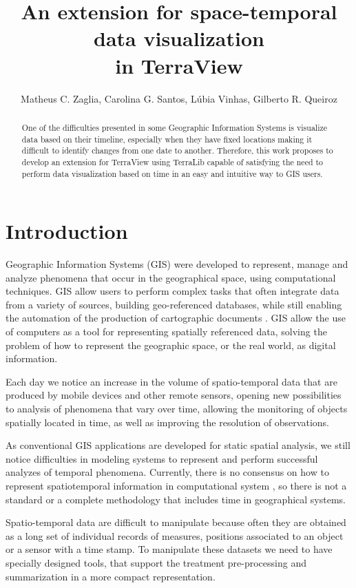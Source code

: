 \documentclass[12pt]{article}
\title{An extension for space-temporal data visualization\\ in TerraView}
\author{Matheus C. Zaglia\inst{1}, Carolina G. Santos\inst{1}, Lúbia
  Vinhas\inst{1}, Gilberto R. Queiroz\inst{1} }
\begin{document}
 

\maketitle

\begin{abstract}
  One of the difficulties presented in some Geographic Information Systems is visualize data based on their timeline, especially when they have fixed locations making it difficult to identify changes from one date to another. Therefore, this work proposes to develop an extension for TerraView using TerraLib capable of satisfying the need to perform data visualization based on time in an easy and intuitive way to GIS users.
\end{abstract}


\section{Introduction}

Geographic Information Systems (GIS) were developed to represent, manage and analyze phenomena that occur in the geographical space, using computational techniques. GIS allow users to perform complex tasks that often integrate data from a variety of sources, building geo-referenced databases, while still enabling the automation of the production of cartographic documents \cite{camara:01}. GIS allow the use of computers as a tool for representing spatially referenced data, solving the problem of how to represent the geographic space, or the real world, as digital information. 

Each day we notice an increase in the volume of spatio-temporal data that are produced by mobile devices and other remote sensors, opening new possibilities to analysis of phenomena that vary over time, allowing the monitoring of objects spatially located in time, as well as improving the resolution of observations. 

As conventional GIS applications are developed for static spatial analysis, we still notice difficulties in modeling systems to represent and perform successful analyzes of temporal phenomena. Currently, there is no consensus on how to represent spatiotemporal information in computational system \cite {karine:15}, so there is not a standard or a complete methodology that includes time in geographical systems. 

Spatio-temporal data are difficult to manipulate because often they are obtained as a long set of individual records of measures, positions associated to an object or a sensor with a time stamp. To manipulate these datasets we need to have specially designed tools, that support the treatment pre-processing and summarization in a more compact representation. 
\end{document}
